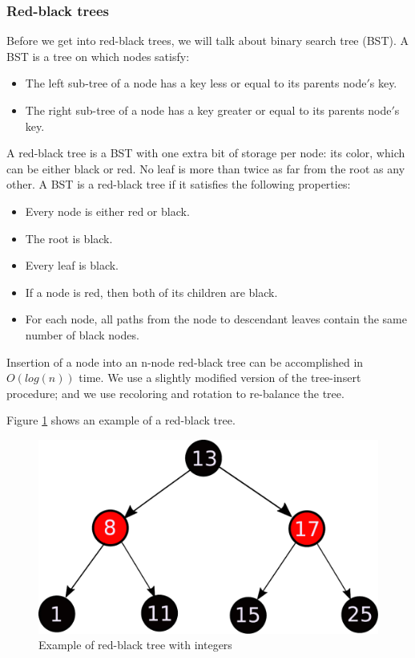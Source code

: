 \documentclass{sig-alternate-05-2015}
\begin{document}
    \subsubsection{Red-black trees}
      Before we get into red-black trees, we will talk about binary search tree (BST). A BST is a tree on which nodes satisfy:
      \begin{itemize}
        \item The left sub-tree of a node has a key less or equal to its parents node$'$s key.
        \item The right sub-tree of a node has a key greater or equal to its parents node$'$s key. \cite{Tuto:Data}
      \end{itemize}
      A red-black tree is a BST with one extra bit of storage per node: its color, which can be either black or red. \cite{Cormen:Algorithms}
      No leaf is more than twice as far from the root as any other. \cite{Black:RBTree}
      A BST is a red-black tree if it satisfies the following properties:
      \begin{itemize}
        \item Every node is either red or black.
        \item The root is black.
        \item Every leaf is black.
        \item If a node is red, then both of its children are black.
        \item For each node, all paths from the node to descendant leaves contain the same number of black nodes.
      \end{itemize}
      Insertion of a node into an n-node red-black tree can be accomplished in $O(log(n))$
      time. We use a slightly modified version of the tree-insert procedure; and we use recoloring and rotation to re-balance the tree. \cite{Cormen:Algorithms}

      Figure \ref{img:RBTree} shows an example of a red-black tree.

      \begin{figure}
        \centering
        \includegraphics[scale=0.35]{RBTree.pdf}
        \caption{Example of red-black tree with integers}
        \label{img:RBTree}
      \end{figure}
\end{document}
